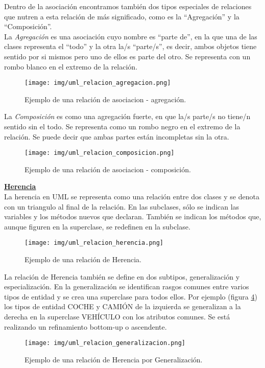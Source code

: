 \documentclass[10pt,a4paper,titlepage]{article}
\begin{document}
Dentro de la asociación encontramos también dos tipos especiales de relaciones que nutren a esta relación de más significado, como es la ``Agregación'' y la ``Composición''. \\

La \textit{Agregación} es una asociación cuyo nombre es ``parte de'', en la que una de las clases representa el ``todo'' y la otra la/s ``parte/s'', es decir, ambos objetos tiene sentido por si mismos pero uno de ellos es parte del otro. Se representa con un rombo blanco en el extremo de la relación.\\
\begin{figure}[H] %
\centering
\texttt{[image: img/uml\_relacion\_agregacion.png]}
\caption{Ejemplo de una relación de asociacion - agregación.} \label{fig:uml_rel_agregacion}
\end{figure}

La \textit{Composición} es como una agregación fuerte, en que la/s parte/s no tiene/n sentido sin el todo. Se representa como un rombo negro en el extremo de la relación. Se puede decir que ambas partes están incompletas sin la otra.
\begin{figure}[H] %
\centering
\texttt{[image: img/uml\_relacion\_composicion.png]}
\caption{Ejemplo de una relación de asociacion - composición.} \label{fig:uml_rel_composicion}
\end{figure}

\underline{\textbf{Herencia}}\\
La herencia en UML se representa como una relación entre dos clases y se denota con un
triangulo al final de la relación. En las subclases, sólo se indican las variables y los métodos nuevos que declaran. También se indican los métodos que, aunque figuren en la superclase, se redefinen en la subclase. 
\begin{figure}[H] %
\centering
\texttt{[image: img/uml\_relacion\_herencia.png]}
\caption{Ejemplo de una relación de Herencia.} \label{fig:uml_rel_herencia}
\end{figure}

La relación de Herencia también se define en dos subtipos, generalización y especialización. En la generalización se identifican rasgos comunes entre varios tipos de entidad y se crea una superclase para todos ellos. Por ejemplo (figura \ref{fig:uml_rel_generalizacion}) los tipos de entidad COCHE y CAMIÓN de la izquierda se generalizan a la derecha en la superclase VEHÍCULO con los atributos comunes. Se está realizando un refinamiento bottom-up o ascendente.
\begin{figure}[H] %
\centering
\texttt{[image: img/uml\_relacion\_generalizacion.png]}
\caption{Ejemplo de una relación de Herencia por Generalización.} \label{fig:uml_rel_generalizacion}
\end{figure}
\end{document}
